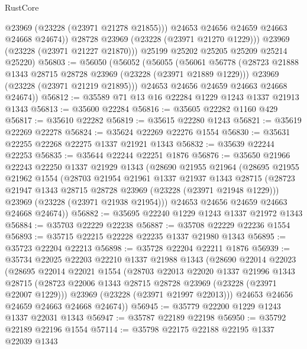 \begin{lexlean}{RustCore}
\begin{coremodule}
                @23969
                (@23228 (@23971 @21278 @21855)))
              @24653
              @24656
              @24659
              @24663
              @24668
              @24674))
          @28728
          @23969
          (@23228 (@23971 @21270 @1229)))
        @23969
        (@23228 (@23971 @21227 @21870)))
      @25199
      @25202
      @25205
      @25209
      @25214
      @25220)
@56803 := @56050
    (@56052
      (@56055
        (@56061
          @56778
          (@28723 @21888 @1343 @28715 @28728 @23969 (@23228 (@23971 @21889 @1229)))
          @23969
          (@23228 (@23971 @21219 @21895)))
        @24653
        @24656
        @24659
        @24663
        @24668
        @24674))
@56812 := @35589 @71 @13 @16 @22284 @1229 @1243 @1337 @21913 @1343
@56813 := @35600 @22284
@56816 := @35605 @22282 @1160 @429
@56817 := @35610 @22282
@56819 := @35615 @22280 @1243
@56821 := @35619 @22269 @22278
@56824 := @35624 @22269 @22276 @1554
@56830 := @35631 @22255 @22268 @22275 @1337 @21921 @1343
@56832 := @35639 @22244 @22253
@56835 := @35644 @22244 @22251 @1876
@56876 := @35650
    @21966
    @22243
    @22250
    @1337
    @21929
    @1343
    (@28690
      @21955
      @21964
      (@28695
        @21955
        @21962
        @1554
        (@28703
          @21954
          @21961
          @1337
          @21937
          @1343
          @28715
          (@28723 @21947 @1343 @28715 @28728 @23969 (@23228 (@23971 @21948 @1229)))
          @23969
          (@23228 (@23971 @21938 @21954)))
        @24653
        @24656
        @24659
        @24663
        @24668
        @24674))
@56882 := @35695 @22240 @1229 @1243 @1337 @21972 @1343
@56884 := @35703 @22229 @22238
@56887 := @35708 @22229 @22236 @1554
@56893 := @35715 @22215 @22228 @22235 @1337 @21980 @1343
@56895 := @35723 @22204 @22213
@56898 := @35728 @22204 @22211 @1876
@56939 := @35734
    @22025
    @22203
    @22210
    @1337
    @21988
    @1343
    (@28690
      @22014
      @22023
      (@28695
        @22014
        @22021
        @1554
        (@28703
          @22013
          @22020
          @1337
          @21996
          @1343
          @28715
          (@28723 @22006 @1343 @28715 @28728 @23969 (@23228 (@23971 @22007 @1229)))
          @23969
          (@23228 (@23971 @21997 @22013)))
        @24653
        @24656
        @24659
        @24663
        @24668
        @24674))
@56945 := @35779 @22200 @1229 @1243 @1337 @22031 @1343
@56947 := @35787 @22189 @22198
@56950 := @35792 @22189 @22196 @1554
@57114 := @35798
    @22175
    @22188
    @22195
    @1337
    @22039
    @1343

\end{coremodule}
\end{lexlean}
